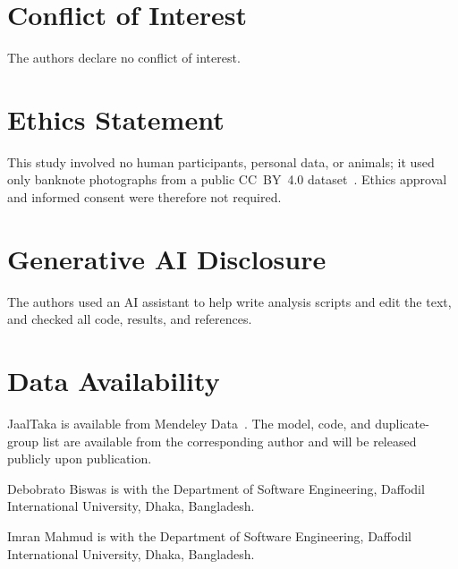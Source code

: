 \documentclass[journal]{IEEEtran}
\begin{document}
\section*{Conflict of Interest}
The authors declare no conflict of interest.

\section*{Ethics Statement}
This study involved no human participants, personal data, or animals; it used only
banknote photographs from a public CC~BY~4.0 dataset~\cite{jaaltaka_data}. Ethics
approval and informed consent were therefore not required.

\section*{Generative AI Disclosure}
The authors used an AI assistant to help write analysis scripts and edit the text, and
checked all code, results, and references.

\section*{Data Availability}
JaalTaka is available from Mendeley Data~\cite{jaaltaka_data}. The model, code, and
duplicate-group list are available from the corresponding author and will be released
publicly upon publication.




\begin{IEEEbiographynophoto}{Debobrato Biswas}
is with the Department of Software Engineering, Daffodil International University,
Dhaka, Bangladesh. %
\end{IEEEbiographynophoto}

\begin{IEEEbiographynophoto}{Imran Mahmud}
is with the Department of Software Engineering, Daffodil International University,
Dhaka, Bangladesh. %
\end{IEEEbiographynophoto}
\end{document}
